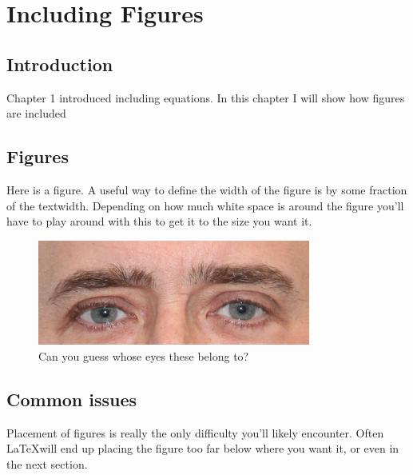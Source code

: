 \chapter[Including Figures]{Including Figures}
\label{ch:chapter2}


\section{Introduction}

Chapter 1 introduced including equations. In this chapter I will show how figures are included


\section{Figures}

Here is a figure. A useful way to define the width of the figure is by some fraction of the textwidth. Depending on how much white space is around the figure you'll have to play around with this to get it to the size you want it.

\begin{figure}[!hbt]
    \centering
    \includegraphics[width=0.8\textwidth]{chapter2_figures/GuessWho.jpg}
    \caption{Can you guess whose eyes these belong to?}
    \label{fig:guess who}
\end{figure}

\section{Common issues}

Placement of figures is really the only difficulty you'll likely encounter. Often \LaTeX will end up placing the figure too far below where you want it, or even in the next section.

